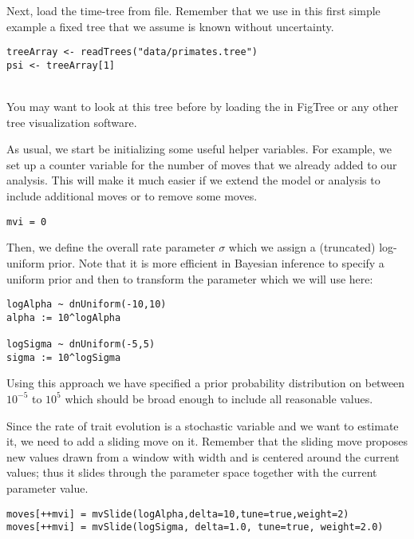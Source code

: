 Next, load the time-tree from file. Remember that we use in this first simple example a fixed tree that we assume is known without uncertainty.
{\tt \small \begin{snugshade*}
\begin{lstlisting}
treeArray <- readTrees("data/primates.tree")
psi <- treeArray[1]
\end{lstlisting}
\end{snugshade*}}
\noindent \\ \impmark You may want to look at this tree before by loading the  in FigTree or any other tree visualization software.

As usual, we start be initializing some useful helper variables.
For example, we set up a counter variable for the number of moves that we already added to our analysis.
This will make it much easier if we extend the model or analysis to include additional moves or to remove some moves.
{\tt \begin{snugshade*}
\begin{lstlisting}
mvi = 0 
\end{lstlisting}
\end{snugshade*}}

Then, we define the overall rate parameter $\sigma$ which we assign a (truncated) log-uniform prior. Note that it is more efficient in Bayesian inference to specify a uniform prior and then to transform the parameter which we will use here:
{\tt \small \begin{snugshade*}
\begin{lstlisting}
logAlpha ~ dnUniform(-10,10)
alpha := 10^logAlpha

logSigma ~ dnUniform(-5,5)
sigma := 10^logSigma
\end{lstlisting}
\end{snugshade*}}
Using this approach we have specified a prior probability distribution on  between $10^{-5}$ to $10^5$ which should be broad enough to include all reasonable values.

Since the rate of trait evolution  is a stochastic variable and we want to estimate it, we need to add a sliding move on it. Remember that the sliding move proposes new values drawn from a window with width  and is centered around the current values; thus it slides through the parameter space together with the current parameter value.
{\tt \small \begin{snugshade*}
\begin{lstlisting}
moves[++mvi] = mvSlide(logAlpha,delta=10,tune=true,weight=2)
moves[++mvi] = mvSlide(logSigma, delta=1.0, tune=true, weight=2.0)
\end{lstlisting}
\end{snugshade*}}

